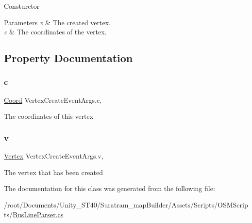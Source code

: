 Consturctor 


\begin{DoxyParams}{Parameters}
{\em v} & The created vertex.\\
\hline
{\em c} & The coordinates of the vertex.\\
\hline
\end{DoxyParams}


\subsection{Property Documentation}
\mbox{\label{classVertexCreateEventArgs_a69cf9a65e5ecd6f26cafa1141bad6e0c}} 
\subsubsection{\texorpdfstring{c}{c}}
{\footnotesize\ttfamily \hyperlink{structCoord}{Coord} Vertex\+Create\+Event\+Args.\+c\hspace{0.3cm}{\ttfamily [get]}, {}}



The coordinates of this vertex

\mbox{\label{classVertexCreateEventArgs_a6ce40981e1826b6d52987abf3382172a}} 
\subsubsection{\texorpdfstring{v}{v}}
{\footnotesize\ttfamily \hyperlink{structVertex}{Vertex} Vertex\+Create\+Event\+Args.\+v\hspace{0.3cm}{\ttfamily [get]}, {}}



The vertex that has been created



The documentation for this class was generated from the following file\+:\begin{DoxyCompactItemize}
\item 
/root/\+Documents/\+Unity\+\_\+\+S\+T40/\+Suratram\+\_\+map\+Builder/\+Assets/\+Scripts/\+O\+S\+M\+Scripts/\hyperlink{BusLineParser_8cs}{Bus\+Line\+Parser.\+cs}\end{DoxyCompactItemize}
